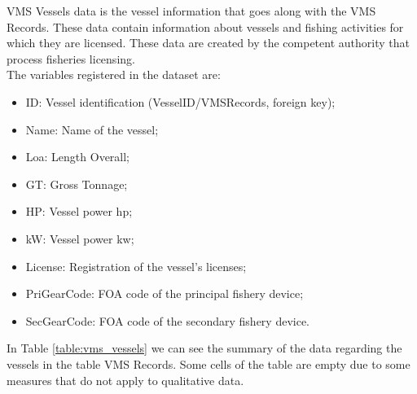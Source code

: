 VMS Vessels data is the vessel information that goes along with the VMS Records. These data contain information about vessels and fishing activities for which they are licensed. These data are created by the competent authority that process fisheries licensing. \\
The variables registered in the dataset are:
\begin{itemize}
\item ID: Vessel identification (VesselID/VMSRecords, foreign key);
\item Name: Name of the vessel;
\item Loa: Length Overall; 
\item GT: Gross Tonnage;
\item HP: Vessel power \gls{hp};
\item kW: Vessel power \gls{kw};
\item License: Registration of the vessel's licenses;
\item PriGearCode: FOA code of the principal fishery device;
\item SecGearCode: FOA code of the secondary fishery device.
\end{itemize}

In Table \ref{table:vms_vessels} we can see the summary of the data regarding the vessels in the table VMS Records.
Some cells of the table are empty due to some measures that do not apply to qualitative data.

